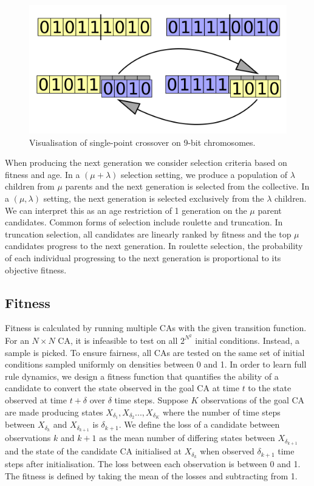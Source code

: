 \begin{figure}[!h]
\centering
    \includegraphics[width=.5\textwidth]{images/single-crossover.png}
    \caption{Visualisation of single-point crossover on 9-bit chromosomes. \cite{singlecrossover}}
\label{fig:single-crossover}
\end{figure}

When producing the next generation we consider selection criteria based on fitness and age. In a $(\mu + \lambda)$ selection setting, we produce a population of $\lambda$ children from $\mu$ parents and the next generation is selected from the collective. In a $(\mu, \lambda)$ setting, the next generation is selected exclusively from the $\lambda$ children. We can interpret this as an age restriction of 1 generation on the $\mu$ parent candidates. Common forms of selection include roulette and truncation. In truncation selection, all candidates are linearly ranked by fitness and the top $\mu$ candidates progress to the next generation. In roulette selection, the probability of each individual progressing to the next generation is proportional to its objective fitness.\\

\subsection{Fitness}

Fitness is calculated by running multiple CAs with the given transition function. For an $N \times N$ CA, it is infeasible to test on all $2^{N^2}$ initial conditions. Instead, a sample is picked. To ensure fairness, all CAs are tested on the same set of initial conditions sampled uniformly on densities between 0 and 1. In order to learn full rule dynamics, we design a fitness function that quantifies the ability of a candidate to convert the state observed in the goal CA at time $t$ to the state observed at time $t+\delta$ over $\delta$ time steps. Suppose $K$ observations of the goal CA are made producing states $X_{\delta_1}, X_{\delta_2} ..., X_{\delta_K}$ where the number of time steps between $X_{\delta_k}$ and $X_{\delta_{k+1}}$ is $\delta_{k+1}$. We define the loss of a candidate between observations $k$ and $k+1$ as the mean number of differing states between $X_{\delta_{k+1}}$ and the state of the candidate CA initialised at $X_{\delta_k}$ when observed $\delta_{k+1}$ time steps after initialisation. The loss between each observation is between 0 and 1. The fitness is defined by taking the mean of the losses and subtracting from 1.

